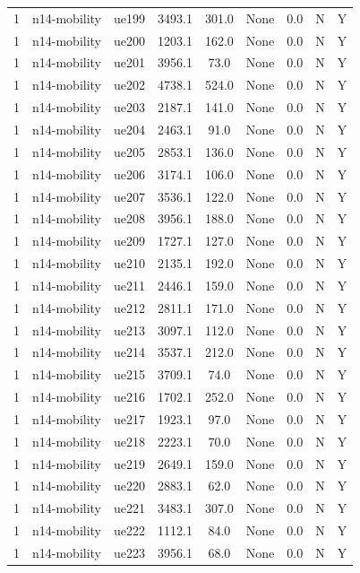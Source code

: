 \begin{table}[ht]
\begin{tabular}{|c|c|c|c|c|c|c|c|c|}
1 & n14-mobility & ue199 & 3493.1 & 301.0 & None & 0.0 & N & Y \\
1 & n14-mobility & ue200 & 1203.1 & 162.0 & None & 0.0 & N & Y \\
1 & n14-mobility & ue201 & 3956.1 & 73.0 & None & 0.0 & N & Y \\
1 & n14-mobility & ue202 & 4738.1 & 524.0 & None & 0.0 & N & Y \\
1 & n14-mobility & ue203 & 2187.1 & 141.0 & None & 0.0 & N & Y \\
1 & n14-mobility & ue204 & 2463.1 & 91.0 & None & 0.0 & N & Y \\
1 & n14-mobility & ue205 & 2853.1 & 136.0 & None & 0.0 & N & Y \\
1 & n14-mobility & ue206 & 3174.1 & 106.0 & None & 0.0 & N & Y \\
1 & n14-mobility & ue207 & 3536.1 & 122.0 & None & 0.0 & N & Y \\
1 & n14-mobility & ue208 & 3956.1 & 188.0 & None & 0.0 & N & Y \\
1 & n14-mobility & ue209 & 1727.1 & 127.0 & None & 0.0 & N & Y \\
1 & n14-mobility & ue210 & 2135.1 & 192.0 & None & 0.0 & N & Y \\
1 & n14-mobility & ue211 & 2446.1 & 159.0 & None & 0.0 & N & Y \\
1 & n14-mobility & ue212 & 2811.1 & 171.0 & None & 0.0 & N & Y \\
1 & n14-mobility & ue213 & 3097.1 & 112.0 & None & 0.0 & N & Y \\
1 & n14-mobility & ue214 & 3537.1 & 212.0 & None & 0.0 & N & Y \\
1 & n14-mobility & ue215 & 3709.1 & 74.0 & None & 0.0 & N & Y \\
1 & n14-mobility & ue216 & 1702.1 & 252.0 & None & 0.0 & N & Y \\
1 & n14-mobility & ue217 & 1923.1 & 97.0 & None & 0.0 & N & Y \\
1 & n14-mobility & ue218 & 2223.1 & 70.0 & None & 0.0 & N & Y \\
1 & n14-mobility & ue219 & 2649.1 & 159.0 & None & 0.0 & N & Y \\
1 & n14-mobility & ue220 & 2883.1 & 62.0 & None & 0.0 & N & Y \\
1 & n14-mobility & ue221 & 3483.1 & 307.0 & None & 0.0 & N & Y \\
1 & n14-mobility & ue222 & 1112.1 & 84.0 & None & 0.0 & N & Y \\
1 & n14-mobility & ue223 & 3956.1 & 68.0 & None & 0.0 & N & Y \\

\end{tabular}
\end{table}
